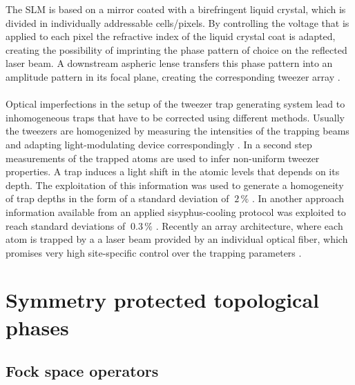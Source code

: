 The SLM is based on a mirror coated with a birefringent liquid crystal, which is divided in individually addressable cells/pixels. By controlling the voltage that is applied to each pixel the refractive index of the liquid crystal coat is adapted, creating the possibility of imprinting the phase pattern of choice on the reflected laser beam. A downstream aspheric lense transfers this phase pattern into an amplitude pattern in its focal plane, creating the corresponding tweezer array \cite{nogretteSingleAtomTrappingHolographic2014a}.\\\\
Optical imperfections in the setup of the tweezer trap generating system lead to inhomogeneous traps that have to be corrected using different methods. Usually the tweezers are homogenized by measuring the intensities of the trapping beams and adapting light-modulating device correspondingly \cite{nogretteSingleAtomTrappingHolographic2014a}. In a second step measurements of the trapped atoms are used to infer non-uniform tweezer properties. A trap induces a light shift in the atomic levels that depends on its depth. The exploitation of this information was used to generate a homogeneity of trap depths in the form of a standard deviation of $~2\,\%$ \cite{endresAtombyatomAssemblyDefectfree2016,tamuraHighlyUniformHolographic2016}. In another approach information available from an applied sisyphus-cooling protocol was exploited to reach standard deviations of $~0.3\,\%$ \cite{taoUniversalGlobalGates2026}. Recently an array architecture, where each atom is trapped by a a laser beam provided by an individual optical fiber, which promises very high site-specific control over the trapping parameters \cite{liFiberArrayArchitecture2025}.





\section{Symmetry protected topological phases}
\subsection{Fock space operators}
